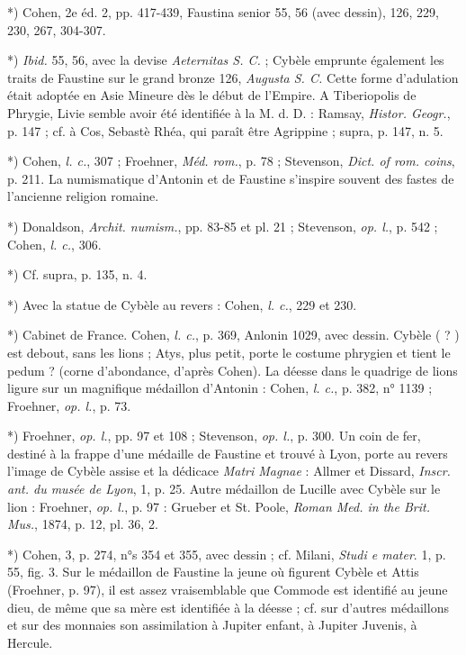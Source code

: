\documentclass[a4paper, 11pt, oneside, polutonikogreek, french]{article}
\begin{document}
*) Cohen, 2e éd. 2, pp. 417-439, Faustina senior 55, 56 (avec dessin), 126, 229, 230, 267, 304-307.

*) \emph{Ibid.} 55, 56, avec la devise \emph{Aeternitas S. C.} ; Cybèle emprunte également les traits de Faustine sur le grand bronze 126, \emph{Augusta S. C.} Cette forme d'adulation était adoptée en Asie Mineure dès le début de l'Empire. A Tiberiopolis de Phrygie, Livie semble avoir été identifiée à la M. d. D. : Ramsay, \emph{Histor. Geogr.}, p. 147 ; cf. à Cos, Sebastè Rhéa, qui paraît être Agrippine ; supra, p. 147, n. 5.

*) Cohen, \emph{l. c.}, 307 ; Froehner, \emph{Méd. rom.}, p. 78 ; Stevenson, \emph{Dict. of rom. coins}, p. 211. La numismatique d'Antonin et de Faustine s'inspire souvent des fastes de l'ancienne religion romaine.

*) Donaldson, \emph{Archit. numism.}, pp. 83-85 et pl. 21 ; Stevenson, \emph{op. l.}, p. 542 ; Cohen, \emph{l. c.}, 306.

*) Cf. supra, p. 135, n. 4.

*) Avec la statue de Cybèle au revers : Cohen, \emph{l. c.}, 229 et 230.

*) Cabinet de France. Cohen, \emph{l. c.}, p. 369, Anlonin 1029, avec dessin. Cybèle ( ? ) est debout, sans les lions ; Atys, plus petit, porte le costume phrygien et tient le pedum ? (corne d'abondance, d'après Cohen). La déesse dans le quadrige de lions ligure sur un magnifique médaillon d'Antonin : Cohen, \emph{l. c.}, p. 382, n° 1139 ; Froehner, \emph{op. l.}, p. 73.

*) Froehner, \emph{op. l.}, pp. 97 et 108 ; Stevenson, \emph{op. l.}, p. 300. Un coin de fer, destiné à la frappe d'une médaille de Faustine et trouvé à Lyon, porte au revers l'image de Cybèle assise et la dédicace \emph{Matri Magnae} : Allmer et Dissard, \emph{Inscr. ant. du musée de Lyon}, 1, p. 25. Autre médaillon de Lucille avec Cybèle sur le lion : Froehner, \emph{op. l.}, p. 97 : Grueber et St. Poole, \emph{Roman Med. in the Brit. Mus.}, 1874, p. 12, pl. 36, 2.

*) Cohen, 3, p. 274, n°s 354 et 355, avec dessin ; cf. Milani, \emph{Studi e mater}. 1, p. 55, fig. 3. Sur le médaillon de Faustine la jeune où figurent Cybèle et Attis (Froehner, p. 97), il est assez vraisemblable que Commode est identifié au jeune dieu, de même que sa mère est identifiée à la déesse ; cf. sur d'autres médaillons et sur des monnaies son assimilation à Jupiter enfant, à Jupiter Juvenis, à Hercule.
\end{document}
